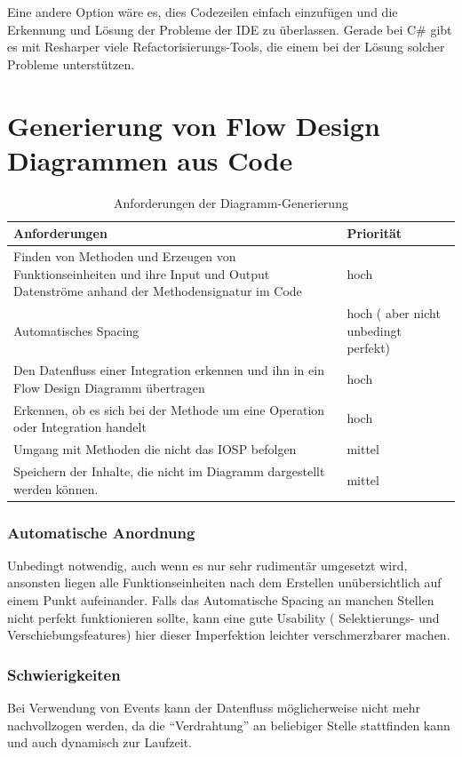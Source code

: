   Eine andere Option wäre es, dies Codezeilen einfach einzufügen und die Erkennung und Lösung der
  Probleme der IDE zu überlassen. Gerade bei C\# gibt es mit Resharper viele
  Refactorisierungs-Tools, die einem bei der Lösung solcher Probleme unterstützen.



\section{Generierung von Flow Design Diagrammen aus Code}
\begin{table}[H]
\begin{tabularx}{\textwidth}{X|l}
Anforderungen & Priorität\\
 \hline \hline
Finden von Methoden und Erzeugen von Funktionseinheiten und ihre Input und Output Datenströme anhand der Methodensignatur im Code & hoch\\ \hline
Automatisches Spacing & hoch ( aber nicht unbedingt perfekt)\\ \hline
Den Datenfluss einer Integration erkennen und ihn in ein Flow Design Diagramm übertragen & hoch\\ \hline
Erkennen, ob es sich bei der Methode um eine Operation oder Integration handelt & hoch\\ \hline
Umgang mit Methoden die nicht das IOSP befolgen & mittel\\ \hline
Speichern der Inhalte, die nicht im Diagramm dargestellt werden können. & mittel\\ \hline
\end{tabularx}
\caption{Anforderungen der Diagramm-Generierung}
\end{table}



\subsubsection{Automatische Anordnung}

Unbedingt notwendig, auch wenn es nur sehr rudimentär umgesetzt wird, ansonsten liegen
alle Funktionseinheiten nach dem Erstellen unübersichtlich auf einem Punkt aufeinander.
Falls das Automatische Spacing an manchen Stellen nicht perfekt funktionieren
sollte, kann eine gute Usability ( Selektierungs- und Verschiebungsfeatures)
hier dieser Imperfektion leichter verschmerzbarer machen.

\subsubsection{Schwierigkeiten}
Bei Verwendung von Events kann der Datenfluss möglicherweise nicht mehr nachvollzogen werden, da die \enquote{Verdrahtung} an beliebiger Stelle stattfinden kann und auch dynamisch zur Laufzeit.


